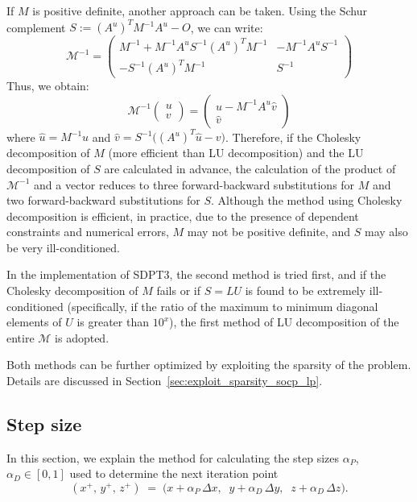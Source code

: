 \documentclass{scrartcl}
\begin{document}
If $M$ is positive definite, another approach can be taken. Using the Schur complement $S := (A^u)^T M^{-1} A^u - O$, we can write:
\[
\mathcal{M}^{-1}=\begin{pmatrix}
    M^{-1} + M^{-1} A^u S^{-1} (A^u)^T M^{-1} & -M^{-1} A^u S^{-1} \\
    -S^{-1} (A^u)^T M^{-1} & S^{-1}
\end{pmatrix}
\]
Thus, we obtain:
\[
    \mathcal{M}^{-1}\begin{pmatrix}u \\ v \end{pmatrix} = \begin{pmatrix} \hat{u} - M^{-1} A^u \hat{v} \\ \hat{v} \end{pmatrix}
\]
where $\hat{u} = M^{-1} u$ and $\hat{v} = S^{-1}\big((A^u)^T \hat{u} - v \big)$.
Therefore, if the Cholesky decomposition of $M$ (more efficient than LU decomposition) and the LU decomposition of $S$ are calculated in advance, the calculation of the product of $\mathcal{M}^{-1}$ and a vector reduces to three forward-backward substitutions for $M$ and two forward-backward substitutions for $S$.
Although the method using Cholesky decomposition is efficient, in practice, due to the presence of dependent constraints and numerical errors, $M$ may not be positive definite, and $S$ may also be very ill-conditioned.

In the implementation of SDPT3, the second method is tried first, and if the Cholesky decomposition of $M$ fails or if $S=LU$ is found to be extremely ill-conditioned (specifically, if the ratio of the maximum to minimum diagonal elements of $U$ is greater than $10^{x}$), the first method of LU decomposition of the entire $\mathcal{M}$ is adopted.

Both methods can be further optimized by exploiting the sparsity of the problem. Details are discussed in Section~\ref{sec:exploit_sparsity_socp_lp}.




\subsection{Step size} \label{sec:step_size}
In this section, we explain the method for calculating the step sizes $\alpha_P$, $\alpha_D \in [0, 1]$ used to determine the next iteration point 
\[
  (x^+,\,y^+,\,z^+) 
  \;=\; 
  \bigl(x + \alpha_P\,\Delta x,\;\; y + \alpha_D\,\Delta y,\;\; z + \alpha_D\,\Delta z\bigr).
\]
\end{document}
